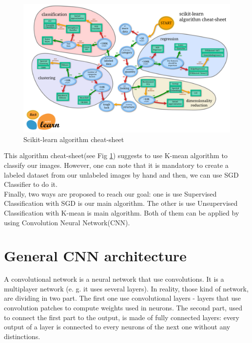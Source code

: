 \documentclass[hidelinks,12pt,a4paper]{report}
\begin{document}
\begin{figure}[ht]
	\includegraphics[width=\textwidth, center]{images/scikit-learn}
	\caption{Scikit-learn algorithm cheat-sheet}
	\label{fig:Scikit-learn}
\end{figure}
This algorithm cheat-sheet(see Fig \ref{fig:Scikit-learn}) suggests to use K-mean algorithm to classify our images. However, one can note that it is mandatory to create a labeled dataset from our unlabeled images by hand and then, we can use SGD Classifier to do it.
\\
Finally, two ways are proposed to reach our goal: one is use Supervised Classification with SGD is our main algorithm. The other is use Unsupervised Classification with K-mean is main algorithm. Both of them can be applied by using Convolution Neural Network(CNN).
\section{General CNN architecture}
A convolutional network is a neural network that use convolutions. It is a multiplayer network (e. g. it uses several layers). In reality, those kind of network, are dividing in two part. The first one use convolutional layers - layers that use convolution patches to compute weights used in neurons. The second part, used to connect the first part to the output, is made of fully connected layers: every output of a layer is connected to every neurons of the next one without any distinctions.
\end{document}
